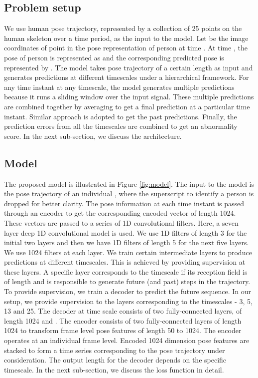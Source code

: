 \documentclass[conference]{IEEEtran}
\begin{document}
\subsection{Problem setup}
We use human pose trajectory, represented by a collection of 25 points on the human skeleton over a time period, as the input to the model. Let  be the image coordinates of  point in the pose representation of  person at time . At time , the pose of  person is represented as  and the corresponding predicted pose is represented by . The model takes pose trajectory of a certain length as input and generates predictions at different timescales under a hierarchical framework. For any time instant at any timescale, the model generates multiple predictions because it runs a sliding window over the input signal. These multiple predictions are combined together by averaging to get a final prediction at a particular time instant. Similar approach is adopted to get the past predictions. Finally, the prediction errors from all the timescales are combined to get an abnormality score. In the next sub-section, we discuss the architecture.

\subsection{Model}
The proposed model is illustrated in Figure \ref{fig:model}. The input to the model is the pose trajectory of an individual , where the superscript to identify a person is dropped for better clarity. The pose information at each time instant  is passed through an encoder  to get the corresponding encoded vector  of length 1024. These vectors are passed to a series of 1D convolutional filters. Here, a seven layer deep 1D convolutional model is used. We use 1D filters of length 3 for the initial two layers and then we have 1D filters of length 5 for the next five layers. We use 1024 filters at each layer. We train certain intermediate layers to produce predictions at different timescales. This is achieved by providing supervision at these layers. A specific layer corresponds to the  timescale if its reception field is of length  and is responsible to generate  future (and past) steps in the trajectory. To provide supervision, we train a decoder to predict the future sequence. In our setup, we provide supervision to the layers corresponding to the timescales - 3, 5, 13 and 25. The decoder  at time scale  consists of two fully-connected layers, of length 1024 and . The encoder  consists of two fully-connected layers of length 1024 to transform frame level pose features of length 50 to 1024. The encoder  operates at an individual frame level. Encoded 1024 dimension pose features   are stacked to form a time series corresponding to the pose trajectory under consideration. The output length for the decoder depends on the specific timescale. In the next sub-section, we discuss the loss function in detail.
\end{document}

